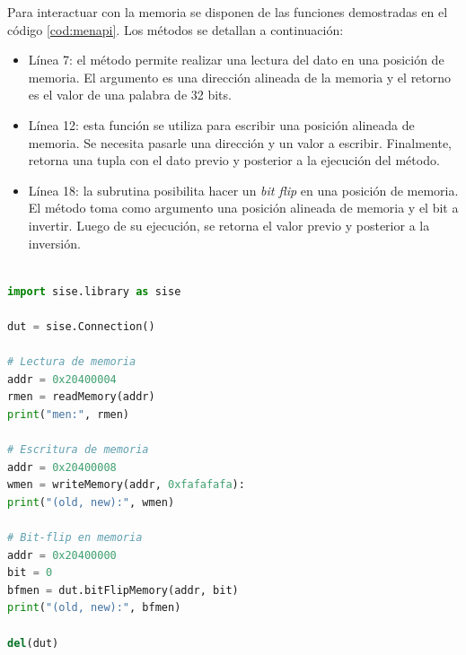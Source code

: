 Para interactuar con la memoria se disponen de las funciones demostradas en el código \ref{cod:menapi}.
Los métodos se detallan a continuación:
\begin{itemize}
    \item Línea 7: el método permite realizar una lectura del dato en una posición de memoria.
        El argumento es una dirección alineada de la memoria y el retorno es el valor de una palabra de 32 bits.
    \item Línea 12: esta función se utiliza para escribir una posición alineada de memoria.
        Se necesita pasarle una dirección y un valor a escribir.
        Finalmente, retorna una tupla con el dato previo y posterior a la ejecución del método.
    \item Línea 18: la subrutina posibilita hacer un \emph{bit flip} en una posición de memoria.
        El método toma como argumento una posición alineada de memoria y el bit a invertir.
        Luego de su ejecución, se retorna el valor previo y posterior a la inversión.
\end{itemize}

\begin{lstlisting}[language=Python,label=cod:menapi,caption=Ejemplo de uso en memoria.]  % Start your code-block

import sise.library as sise

dut = sise.Connection()

# Lectura de memoria
addr = 0x20400004
rmen = readMemory(addr)
print("men:", rmen)

# Escritura de memoria
addr = 0x20400008
wmen = writeMemory(addr, 0xfafafafa):
print("(old, new):", wmen)

# Bit-flip en memoria
addr = 0x20400000
bit = 0
bfmen = dut.bitFlipMemory(addr, bit)
print("(old, new):", bfmen)

del(dut)

\end{lstlisting}

